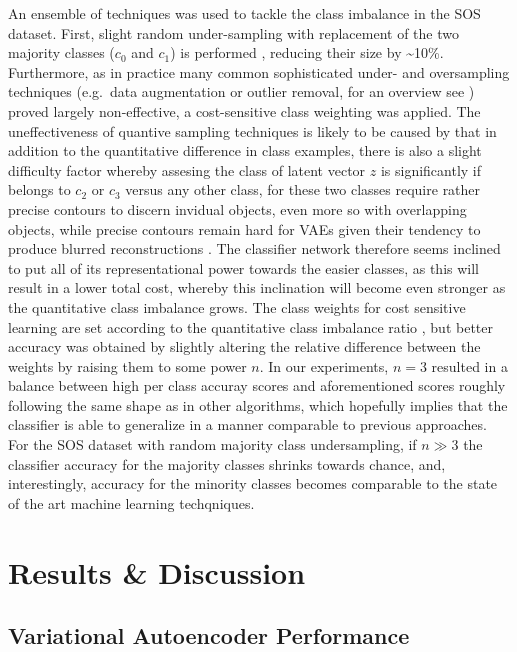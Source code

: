 \documentclass[twocolumn]{article}
\begin{document}
\noindent An ensemble of techniques was used to tackle the class imbalance in the
SOS dataset. First, slight random under-sampling with replacement of the
two majority classes (\(c_0\) and \(c_1\)) is performed
\citep[see][]{JMLR:v18:16-365}, reducing their size by
\textasciitilde{}10\%. Furthermore, as in practice many common
sophisticated under- and oversampling techniques (e.g.~data augmentation
or outlier removal, for an overview see \citet{fernandez2013}) proved
largely non-effective, a cost-sensitive class weighting was applied. The
uneffectiveness of quantive sampling techniques is likely to be caused
by that in addition to the quantitative difference in class examples,
there is also a slight difficulty factor whereby assesing the class of
latent vector \(z\) is significantly if belongs to \(c_2\) or \(c_3\)
versus any other class, for these two classes require rather precise
contours to discern invidual objects, even more so with overlapping
objects, while precise contours remain hard for VAEs given their
tendency to produce blurred reconstructions
\citep{larsen2015autoencoding}. The classifier network therefore seems
inclined to put all of its representational power towards the easier
classes, as this will result in a lower total cost, whereby this
inclination will become even stronger as the quantitative class
imbalance grows. The class weights for cost sensitive learning are set
according to the quantitative class imbalance ratio \citep[similair to
section 3.2 in][]{fernandez2013}, but better accuracy was obtained by
slightly altering the relative difference between the weights by raising
them to some power \(n\). In our experiments, \(n=3\) resulted in a
balance between high per class accuray scores and aforementioned scores
roughly following the same shape as in other algorithms, which hopefully
implies that the classifier is able to generalize in a manner comparable
to previous approaches. For the SOS dataset with random majority class
undersampling, if \(n \gg 3\) the classifier accuracy for the majority
classes shrinks towards chance, and, interestingly, accuracy for the
minority classes becomes comparable to the state of the art machine
learning techqniques.


\hypertarget{results-discussion}{%
\section{Results \& Discussion}\label{results-discussion}}

\hypertarget{variational-autoencoder-performance}{%
\subsection{Variational Autoencoder
Performance}\label{variational-autoencoder-performance}}
\end{document}
